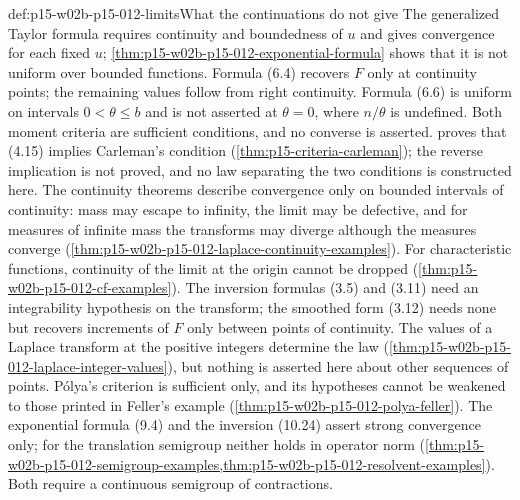 \begin{hbwarning}{def:p15-w02b-p15-012-limits}{What the continuations do not give}
The generalized Taylor formula requires continuity and boundedness of \(u\) and
gives convergence for each fixed \(u\); \cref{thm:p15-w02b-p15-012-exponential-formula}
shows that it is not uniform over bounded functions. Formula (6.4) recovers
\(F\) only at continuity points; the remaining values follow from right
continuity. Formula (6.6) is uniform on intervals \(0<\theta\leq b\) and is
not asserted at \(\theta=0\), where \(n/\theta\) is undefined.
Both moment criteria are sufficient conditions, and no converse is asserted.
 proves that (4.15) implies Carleman's
condition (\cref{thm:p15-criteria-carleman}); the reverse implication is not
proved, and no law separating the two conditions is constructed here.
The continuity theorems describe convergence only on bounded intervals of
continuity: mass may escape to infinity, the limit may be defective, and for
measures of infinite mass the transforms may diverge although the measures
converge (\cref{thm:p15-w02b-p15-012-laplace-continuity-examples}). For
characteristic functions, continuity of the limit at the origin cannot be
dropped (\cref{thm:p15-w02b-p15-012-cf-examples}). The inversion formulas
(3.5) and (3.11) need an integrability hypothesis on the transform; the
smoothed form (3.12) needs none but recovers increments of \(F\) only between
points of continuity. The values of a Laplace transform at the positive
integers determine the law (\cref{thm:p15-w02b-p15-012-laplace-integer-values}),
but nothing is asserted here about other sequences of points. P\'olya's
criterion is sufficient only, and its hypotheses cannot be weakened to those
printed in Feller's example (\cref{thm:p15-w02b-p15-012-polya-feller}). The exponential formula
(9.4) and the inversion (10.24) assert strong convergence only; for the
translation semigroup neither holds in operator norm
(\cref{thm:p15-w02b-p15-012-semigroup-examples,thm:p15-w02b-p15-012-resolvent-examples}).
Both require a continuous semigroup of contractions.
\end{hbwarning}
